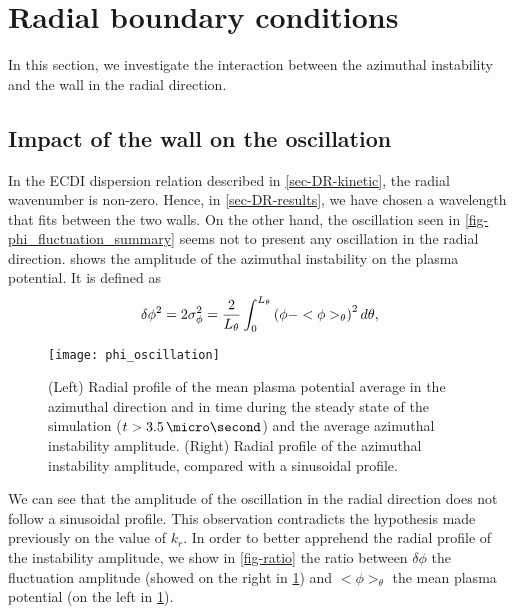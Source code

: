 
\section{Radial boundary conditions}
  \label{sec-DR-BC}
  
  In this section, we investigate the interaction between the azimuthal instability and the wall in the radial direction.
  
  \subsection{Impact of the wall on the oscillation}
  \label{subsec-kr}
  
  In the \ac{ECDI} dispersion relation described in \cref{sec-DR-kinetic}, the radial wavenumber is non-zero.
  Hence, in \cref{sec-DR-results}, we have chosen a wavelength that fits between the two walls.
  On the other hand, the oscillation seen in \cref{fig-phi_fluctuation_summary} seems not to present any oscillation in the radial direction.
   shows the amplitude of the azimuthal instability on the plasma potential.
  It is defined as
  \begin{equation} \label{eq-stdphi}
    \delta \phi^2 = 2 \sigma_{\phi}^2 = \frac{{2}}{L_{\theta}} \int_0^{L_{\theta}} \left(  \phi - <\phi>_{\theta}  \right) ^2 d\theta,
  \end{equation}
  
  \begin{figure}[hbtp]
    \centering
    \texttt{[image: phi\_oscillation]}
    \caption{(Left) Radial profile of the mean plasma potential average in the azimuthal direction  and in time during the steady state of the simulation ($t > 3.5 \,\micro\second$) and the average azimuthal instability amplitude. (Right) Radial profile of the  azimuthal instability amplitude, compared with a sinusoidal profile. }
    \label{fig-phi_osci_profile}
  \end{figure}
  
  
  We can see that the amplitude of the oscillation in the radial direction does not follow a sinusoidal profile.
  This observation contradicts the hypothesis made previously on the value of $k_r$.
  In order to better apprehend the radial profile of the instability amplitude, we show in \cref{fig-ratio} the ratio between $\delta \phi$ the fluctuation amplitude (showed on the right in \cref{fig-phi_osci_profile}) and $<\phi>_{\theta}$  the mean plasma potential (on the left in \cref{fig-phi_osci_profile}).
  
